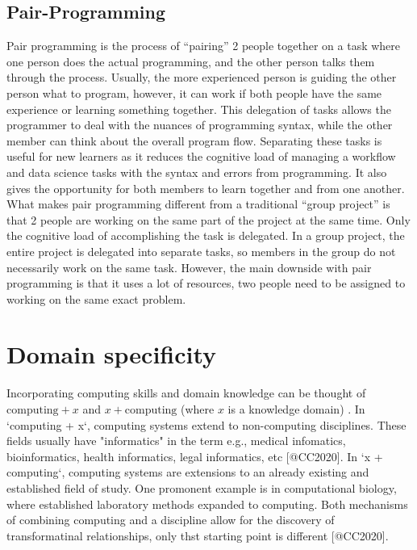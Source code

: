 \documentclass[../main.tex]{subfiles}
\begin{document}
        \subsection{Pair-Programming}
        
        Pair programming is the process of “pairing” 2 people together on a task where one person does the actual programming, and the other person talks them through the process. Usually, the more experienced person is guiding the other person what to program, however, it can work if both people have the same experience or learning something together. This delegation of tasks allows the programmer to deal with the nuances of programming syntax, while the other member can think about the overall program flow. Separating these tasks is useful for new learners as it reduces the cognitive load of managing a workflow and data science tasks with the syntax and errors from programming. It also gives the opportunity for both members to learn together and from one another. What makes pair programming different from a traditional “group project” is that 2 people are working on the same part of the project at the same time. Only the cognitive load of accomplishing the task is delegated. In a group project, the entire project is delegated into separate tasks, so members in the group do not necessarily work on the same task. However, the main downside with pair programming is that it uses a lot of resources, two people need to be assigned to working on the same exact problem.

    \section{Domain specificity}
        \label{se:intro-domain-specificity}

        Incorporating computing skills and domain knowledge can be thought of
        $\text{computing} + x$ and $x + \text{computing}$ (where $x$ is a knowledge domain)
        \cite{cc2020}.
        In `computing + x`, computing systems extend to non-computing disciplines.
        These fields usually have "informatics" in the term
        e.g., medical infomatics, bioinformatics, health informatics, legal informatics, etc [@CC2020].
        In `x + computing`,
        computing systems are extensions to an already existing and established field of study.
        One promonent example is in computational biology,
        where established laboratory methods expanded to computing.
        Both mechanisms of combining computing and a discipline allow for the discovery of transformatinal relationships,
        only thst starting point is different [@CC2020].
\end{document}
